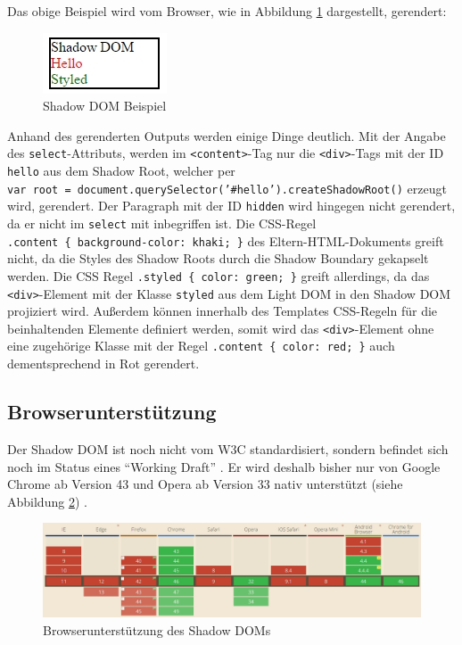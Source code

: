 Das obige Beispiel wird vom Browser, wie in Abbildung \ref{fig:shadowdombeispiel} dargestellt, gerendert:

\begin{figure}[htbp]
 \centering
 \includegraphics{kapitel2/bilder/3-shadow-dom-beispiel}
 \caption{Shadow DOM Beispiel}
 \label{fig:shadowdombeispiel}
\end{figure}

Anhand des gerenderten Outputs werden einige Dinge deutlich. Mit der Angabe des \texttt{select}-Attributs, werden im \texttt{\textless{}content\textgreater{}}-Tag nur die \texttt{\textless{}div\textgreater{}}-Tags mit der ID \texttt{hello} aus dem Shadow Root, welcher per \texttt{var\ root\ =\ document.querySelector('\#hello').createShadowRoot()} erzeugt wird, gerendert. Der Paragraph mit der ID \texttt{hidden} wird hingegen nicht gerendert, da er nicht im \texttt{select} mit inbegriffen ist. Die CSS-Regel \texttt{.content\ \{\ background-color:\ khaki;\ \}} des Eltern-HTML-Dokuments greift nicht, da die Styles des Shadow Roots durch die Shadow Boundary gekapselt werden. Die CSS Regel \texttt{.styled\ \{\ color:\ green;\ \}} greift allerdings, da das \texttt{\textless{}div\textgreater{}}-Element mit der Klasse \texttt{styled} aus dem Light DOM in den Shadow DOM projiziert wird. Außerdem können innerhalb des Templates CSS-Regeln für die beinhaltenden Elemente definiert werden, somit wird das \texttt{\textless{}div\textgreater{}}-Element ohne eine zugehörige Klasse mit der Regel \texttt{.content\ \{\ color:\ red;\ \}} auch dementsprechend in Rot gerendert.


\subsection{Browserunterstützung}\label{browserunterstuxfctzung}

Der Shadow DOM ist noch nicht vom W3C standardisiert, sondern befindet sich noch im Status eines ``Working Draft'' \cite{citeulike:13879687}. Er wird deshalb bisher nur von Google Chrome ab Version 43 und Opera ab Version 33 nativ unterstützt (siehe Abbildung \ref{fig:shadowdombrowser}) \cite{citeulike:13883407}.

\begin{figure}[htbp]
 \centering
 \includegraphics[width=\linewidth]{kapitel2/bilder/3-shadow-dom-browserunterstuetzung}
 \caption{Browserunterstützung des Shadow DOMs}
 \label{fig:shadowdombrowser}
\end{figure}
